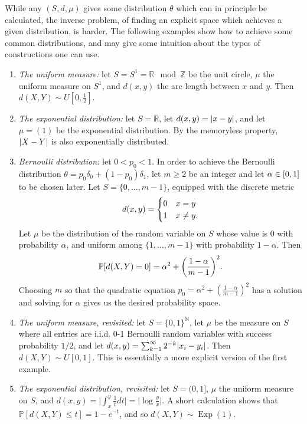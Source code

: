 \documentclass[AHL,Unicode]{cedram}
\DeclareMathOperator{\Exp}{Exp}
\renewcommand*\r{\mathbb{R}}
\newcommand*\n{\mathbb{N}}
\newcommand*\z{\mathbb{Z}}
\newcommand*\p{\mathbb{P}}
\newcommand*\abs[1]{\left|#1\right|}
\let\originalleft\left
\let\originalright\right
\renewcommand{\left}{\mathopen{}\mathclose\bgroup\originalleft}
\renewcommand{\right}{\aftergroup\egroup\originalright}
\let\oldin\in
\renewcommand{\in}{\mathchoice{\oldin}{\oldin}{\,\oldin\,}{\,\oldin\,}}
\begin{document}
While any $(S,d,\mu)$ gives some distribution $\theta$ which can in principle be calculated, the inverse problem, of finding an explicit space which achieves a given distribution, is harder. The following examples show how to achieve some common distributions, and may give some intuition about the types of constructions one can use.
\begin{enumerate}%
\item \emph{The uniform measure:} let $S=S^{1}=\r\mod\z$ be the unit circle, $\mu$ the uniform measure on $S^{1}$, and $d(x,y)$ the arc length between $x$ and $y$. Then $d(X,Y)\sim U[0,\frac{1}{2}]$.
\item \emph{The exponential distribution:} let $S=\r$, let $d(x,y)=\abs{x-y}$, and let $\mu=
(1)$ be the exponential distribution. By the memoryless property, $\abs{X-Y}$ is also exponentially distributed.
\item \emph{Bernoulli distribution:}\label{enu:bernoulli_construction} let $0< p_{0} < 1$. In order to achieve the Bernoulli distribution $\theta=p_{0}\delta_{0}+(1-p_{0})\delta_{1}$, let $m\geq2$ be an integer and let $\alpha\in[0,1]$ to be chosen later. Let $S=\{ 0,\ldots,m-1\} $, equipped with the discrete metric
\[
d\left(x,y\right)=
\begin{cases}
0 & x=y\\
1 & x\neq y.
\end{cases}
\]
Let $\mu$ be the distribution of the random variable on $S$ whose value is $0$ with probability $\alpha$, and uniform among $\{ 1,\ldots,m-1\} $ with probability $1-\alpha$. Then
\begin{equation}\label{eq:bernoulli_probability}
\p\left[d\left(X,Y\right)=0\right]=\alpha^{2}+\left(\frac{1-\alpha}{m-1}\right)^{2}.
\end{equation}
Choosing $m$ so that the quadratic equation $p_{0}=\alpha^{2}+(\frac{1-\alpha}{m-1})^{2}$ has a solution and solving for $\alpha$ gives us the desired probability space.
\item \emph{The uniform measure, revisited:} let $S=\{ 0,1\} ^{\n}$, let $\mu$ be the measure on $S$ where all entries are i.i.d. $0$-1 Bernoulli random variables with success probability $1/2$, and let $d(x,y)=\sum_{k=1}^{\infty}2^{-k}\abs{x_{i}-y_{i}}$. Then $d(X,Y)\sim U[0,1]$. This is essentially a more explicit version of the first example.
\item \emph{The exponential distribution, revisited:} let $S=(0,1]$, $\mu$ the uniform measure on $S$, and $d(x,y)=\lvert\int_{x}^{y}\frac{1}{t}d t\rvert=\lvert\log\frac{y}{x}\rvert$. A short calculation shows that $\p[d(X,Y)\leq t]=1-e^{-t}$, and so $d(X,Y)\sim\Exp(1)$.

\end{enumerate}
\end{document}
